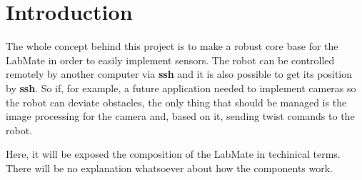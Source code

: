 \chapter{Introduction}

The whole concept behind this project is to make a robust core base for the LabMate in order to easily implement sensors. The robot 
can be controlled remotely by another computer via \textbf{ssh} and it is also possible to get its position by \textbf{ssh}. So if, for example, 
a future application needed to implement cameras so the robot can deviate obstacles, the only thing that should be managed is the image 
processing for the camera and, based on it, sending twist comands to the robot.
\par
Here, it will be exposed the composition of the LabMate in techinical terms. There will be no explanation whatsoever about how the components work. 